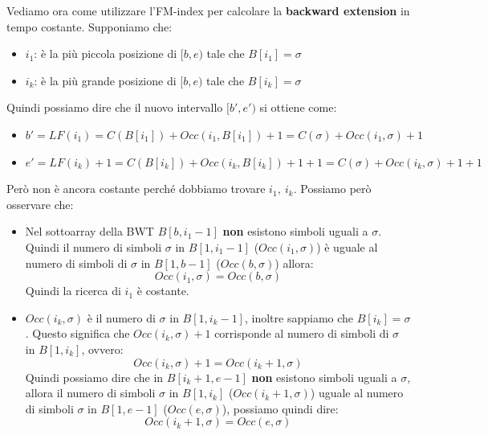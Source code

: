 Vediamo ora come utilizzare l'FM-index per calcolare la \textbf{backward
    extension} in tempo costante. Supponiamo che:
\begin{itemize}
    \item $i_1$: è la più piccola posizione di $[b,e)$ tale che $B[i_1] = \sigma$
    \item $i_k$: è la più grande posizione di $[b,e)$ tale che $B[i_k] = \sigma$
\end{itemize}
Quindi possiamo dire che il nuovo intervallo $[b',e')$ si ottiene come:
\begin{itemize}
    \item $b' = LF(i_1) = C(B[i_1]) + Occ(i_1, B[i_1]) + 1 = C(\sigma) + Occ(i_1,
              \sigma) + 1$
    \item $e' = LF(i_k) + 1 = C(B[i_k]) + Occ(i_k, B[i_k]) + 1 + 1 = C(\sigma) +
              Occ(i_k, \sigma) + 1 + 1$
\end{itemize}
Però non è ancora costante perché dobbiamo trovare $i_1, \ i_k$. Possiamo però
osservare che:
\begin{itemize}
    \item Nel sottoarray della BWT $B[b, i_1 - 1]$ \textbf{non} esistono simboli
          uguali a $\sigma$. Quindi il numero di simboli $\sigma$ in $B[1, i_1 - 1]$
          ($Occ(i_1, \sigma)$) è uguale al numero di simboli di $\sigma$ in
          $B[1, b - 1]$ ($Occ(b,\sigma)$) allora:
          \begin{equation}
              Occ(i_1,\sigma) = Occ(b,\sigma)
          \end{equation}
          Quindi la ricerca di $i_1$ è costante.
    \item $Occ(i_k, \sigma)$ è il numero di $\sigma$ in $B[1, i_k - 1]$, inoltre
          sappiamo che $B[i_k] = \sigma$. Questo significa che $Occ(i_k, \sigma)
              + 1$ corrisponde al numero di simboli di $\sigma$ in $B[1, i_k]$,
          ovvero:
          \begin{equation}
              Occ(i_k, \sigma) + 1 = Occ(i_k + 1, \sigma)
          \end{equation}
          Quindi possiamo dire che in $B[i_k + 1, e - 1]$ \textbf{non} esistono 
          simboli uguali a $\sigma$, allora il numero di simboli $\sigma$ in 
          $B[1, i_k]$ ($Occ(i_k + 1, \sigma)$) uguale al numero di simboli 
          $\sigma$ in $B[1, e - 1]$ ($Occ(e, \sigma)$), possiamo quindi dire:
          \begin{equation}
              Occ(i_k + 1, \sigma) = Occ(e, \sigma)
          \end{equation}
\end{itemize}
